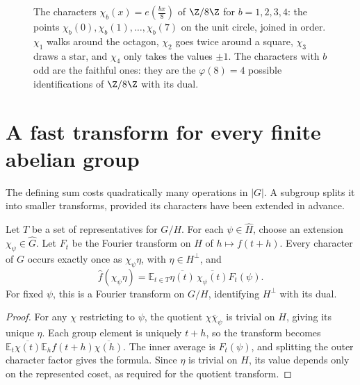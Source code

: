 \begin{figure}[ht]
\centering
{}
\caption{The characters $\chi_b(x)=e(\frac{bx}8)$ of $\Z/8\Z$ for $b=1,2,3,4$: the points $\chi_b(0),\chi_b(1),\dots,\chi_b(7)$ on the unit circle,
joined in order. $\chi_1$ walks around the octagon, $\chi_2$ goes twice around a square, $\chi_3$ draws a star, and $\chi_4$ only takes the
values $\pm1$. The characters with $b$ odd are the faithful ones: they are the $\varphi(8)=4$ possible identifications of $\Z/8\Z$ with its dual.}
\label{fig:characters}
\end{figure}

\section{A fast transform for every finite abelian group}

The defining sum costs quadratically many operations in $|G|$. A subgroup splits it into smaller transforms, provided its characters have been extended in advance.

\begin{lemma}\label{lem:split}
Let $T$ be a set of representatives for $G/H$. For each $\psi\in\widehat H$, choose an extension $\chi_\psi\in\widehat G$. Let $F_t$ be the Fourier transform on $H$ of $h\mapsto f(t+h)$. Every character of $G$ occurs exactly once as $\chi_\psi\eta$, with $\eta\in H^\perp$, and
\[
\hat f(\chi_\psi\eta)=\mathbb E_{t\in T}
\overline{\eta(t)}\,\overline{\chi_\psi(t)}F_t(\psi).
\]
For fixed $\psi$, this is a Fourier transform on $G/H$, identifying $H^\perp$ with its dual.
\end{lemma}
\begin{proof}
For any $\chi$ restricting to $\psi$, the quotient $\chi\bar\chi_\psi$ is trivial on $H$, giving its unique $\eta$. Each group element is uniquely $t+h$, so the transform becomes
$\mathbb E_t\overline{\chi(t)}\mathbb E_hf(t+h)\overline{\chi(h)}$.
The inner average is $F_t(\psi)$, and splitting the outer character factor gives the formula. Since $\eta$ is trivial on $H$, its value depends only on the represented coset, as required for the quotient transform.
\end{proof}

